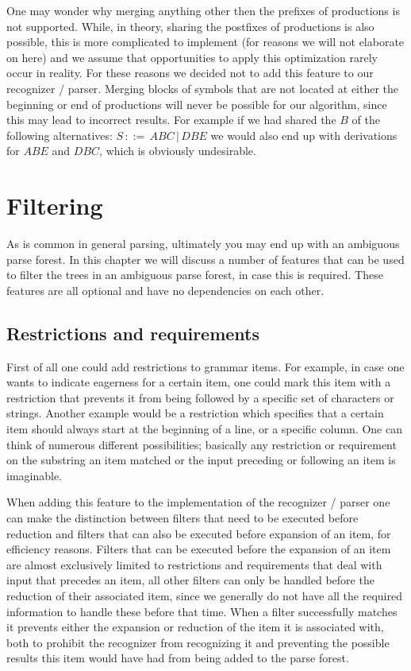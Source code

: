 \documentclass[a4paper,10pt]{article}
\begin{document}
One may wonder why merging anything other then the prefixes of productions is not supported. While, in theory, sharing the postfixes of productions is also possible, this is more complicated to implement (for reasons we will not elaborate on here) and we assume that opportunities to apply this optimization rarely occur in reality. For these reasons we decided not to add this feature to our recognizer / parser. Merging blocks of symbols that are not located at either the beginning or end of productions will never be possible for our algorithm, since this may lead to incorrect results. For example if we had shared the $B$ of the following alternatives: $S\,::=\,ABC\,|\,DBE$ we would also end up with derivations for $ABE$ and $DBC$, which is obviously undesirable.

\pagebreak
\section{Filtering}
\label{chap:filtering}

As is common in general parsing, ultimately you may end up with an ambiguous parse forest. In this chapter we will discuss a number of features that can be used to filter the trees in an ambiguous parse forest, in case this is required. These features are all optional and have no dependencies on each other.

\subsection{Restrictions and requirements}

First of all one could add restrictions to grammar items. For example, in case one wants to indicate eagerness for a certain item, one could mark this item with a restriction that prevents it from being followed by a specific set of characters or strings. Another example would be a restriction which specifies that a certain item should always start at the beginning of a line, or a specific column. One can think of numerous different possibilities; basically any restriction or requirement on the substring an item matched or the input preceding or following an item is imaginable.

When adding this feature to the implementation of the recognizer / parser one can make the distinction between filters that need to be executed before reduction and filters that can also be executed before expansion of an item, for efficiency reasons. Filters that can be executed before the expansion of an item are almost exclusively limited to restrictions and requirements that deal with input that precedes an item, all other filters can only be handled before the reduction of their associated item, since we generally do not have all the required information to handle these before that time. When a filter successfully matches it prevents either the expansion or reduction of the item it is associated with, both to prohibit the recognizer from recognizing it and preventing the possible results this item would have had from being added to the parse forest.
\end{document}
